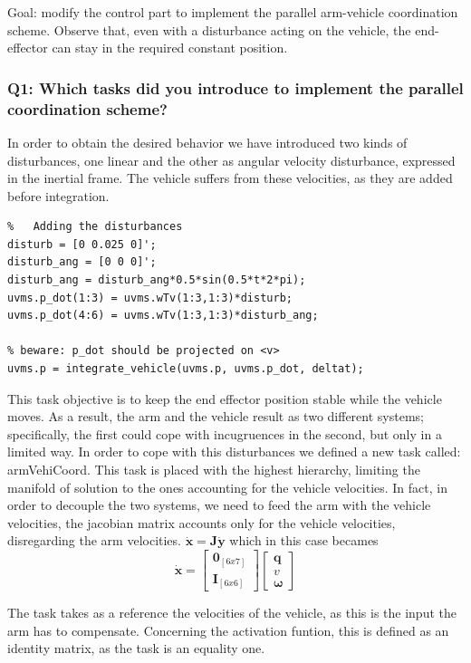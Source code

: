 \documentclass{article}
\begin{document}
Goal: modify the control part to implement the parallel arm-vehicle coordination scheme. Observe that, even with a disturbance acting on the vehicle, the end-effector can stay in the required constant position.

\subsubsection{Q1: Which tasks did you introduce to implement the parallel coordination scheme?}
In order to obtain the desired behavior we have introduced two kinds of disturbances, one linear and the other as angular velocity disturbance, expressed in the inertial frame. The vehicle suffers from these velocities, as they are added before integration. 
\begin{lstlisting}
%	Adding the disturbances
disturb = [0 0.025 0]';
disturb_ang = [0 0 0]';
disturb_ang = disturb_ang*0.5*sin(0.5*t*2*pi);
uvms.p_dot(1:3) = uvms.wTv(1:3,1:3)*disturb;
uvms.p_dot(4:6) = uvms.wTv(1:3,1:3)*disturb_ang;
    
% beware: p_dot should be projected on <v>
uvms.p = integrate_vehicle(uvms.p, uvms.p_dot, deltat);
\end{lstlisting}
This task objective is to keep the end effector position stable while the vehicle moves. As a result, the arm and the vehicle result as two different systems; specifically, the first could cope with incugruences in the second, but only in a limited way.
In order to cope with this disturbances we defined a new task called: armVehiCoord.
This task is placed with the highest hierarchy, limiting the manifold of solution to the ones accounting for the vehicle velocities. In fact, in order to decouple the two systems, we need to feed the arm with the vehicle velocities, the jacobian matrix accounts only for the vehicle velocities, disregarding the arm velocities.
$ \bm{\dot{x}} = \bm{J\dot{y}} $ which in this case becames 
$$ \bm{\dot{x}} = \begin{bmatrix} \bm{0}_{[6x7]} \\ \bm{I}_{[6x6]} \end{bmatrix} \begin{bmatrix} \bm{q}   \\ \bm{\textit{v}} \\ \bm{\omega} \end{bmatrix} $$

The task takes as a reference the velocities of the vehicle, as this is the input the arm has to compensate. Concerning the activation funtion, this is defined as an identity matrix, as the task is an equality one. 
\end{document}

